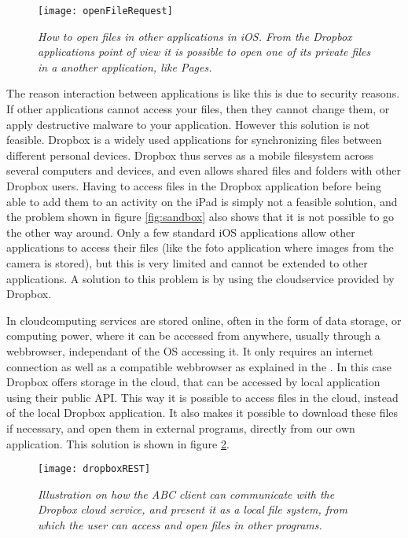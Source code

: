 \begin{figure}[ht!]
  \centering
    \texttt{[image: openFileRequest]}
  \caption{\emph{How to open files in other applications in iOS. From the Dropbox applications point of view it is possible to open one of its private files in a another application, like Pages.}}
  \label{fig:requestOpen}
\end{figure}

The reason interaction between applications is like this is due to security reasons. If other applications cannot access your files, then they cannot change them, or apply destructive malware to your application. However this solution is not feasible. Dropbox is a widely used applications for synchronizing files between different personal devices. Dropbox thus serves as a mobile filesystem across several computers and devices, and even allows shared files and folders with other Dropbox users. Having to access files in the Dropbox application before being able to add them to an activity on the iPad is simply not a feasible solution, and the problem shown in figure \ref{fig:sandbox} also shows that it is not possible to go the other way around. Only a few standard iOS applications allow other applications to access their files (like the foto application where images from the camera is stored), but this is very limited and cannot be extended to other applications. A solution to this problem is by using the cloudservice provided by Dropbox.

In cloudcomputing services are stored online, often in the form of data storage, or computing power, where it can be accessed from anywhere, usually through a webbrowser, independant of the OS accessing it. It only requires an internet connection as well as a compatible webbrowser as explained in the \citet{cloud}. In this case Dropbox offers storage in the cloud, that can be accessed by local application using their public API. This way it is possible to access files in the cloud, instead of the local Dropbox application. It also makes it possible to download these files if necessary, and open them in external programs, directly from our own application. This solution is shown in figure \ref{fig:dropboxREST}.

\begin{figure}[ht!]
  \centering
    \texttt{[image: dropboxREST]}
  \caption{\emph{Illustration on how the ABC client can communicate with the Dropbox cloud service, and present it as a local file system, from which the user can access and open files in other programs.}}
  \label{fig:dropboxREST}
\end{figure}

